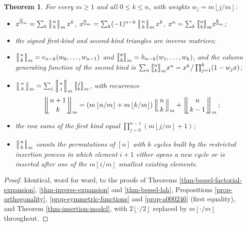 \documentclass[a4paper]{amsart}
\numberwithin{equation}{section}
\newcommand{\mStirling}[0]{\genfrac{\llbracket}{\rrbracket}{0pt}{}}
\newcommand{\mStirlingone}[2]{\left[\mkern-3.8mu\middle|\genfrac{}{}{0pt}{}{#1}{#2}\middle|\mkern-3.8mu\right]}
\newcommand{\mLah}[2]{\left\lfloor\mkern-5.5mu\left\lfloor\genfrac{}{}{0pt}{}{#1}{#2}\right\rfloor\mkern-5.5mu\right\rfloor}
\newcommand{\uuline}[1]{\underline{\underline{#1}}}
\newcommand{\ooline}[1]{\overline{\overline{#1}}}
\newcommand{\floor}[1]{\left\lfloor #1 \right\rfloor}
\newtheorem{theorem}{Theorem}[section]
\begin{document}
\begin{theorem}\label{thm-general-duals}
For every $m \geq 1$ and all $0 \le k \le n$, with weights $w_j = m\floor{j/m}$:
\begin{itemize}
\item[(i)] $x^{\ooline{n}_m} = \sum_k \mStirlingone{n}{k}_m x^k$, \quad $x^{\uuline{n}_m} = \sum_k (-1)^{n-k}\mStirlingone{n}{k}_m x^k$, \quad $x^n = \sum_k \mStirling{n}{k}_m x^{\uuline{k}_m}$;
\item[(ii)] the signed first-kind and second-kind triangles are inverse matrices;
\item[(iii)] $\mStirlingone{n}{k}_m = e_{n-k}(w_0, \ldots, w_{n-1})$ and $\mStirling{n}{k}_m = h_{n-k}(w_1, \ldots, w_k)$, and the column generating function of the second kind is $\sum_n \mStirling{n}{k}_m x^n = x^k\big/\prod_{j=1}^{k}(1 - w_j x)$;
\item[(iv)] $\mLah{n}{k}_m = \sum_j \mStirlingone{n}{j}_m \mStirling{j}{k}_m$, with recurrence
\[
\mLah{n+1}{k}_m = \left(m\floor{n/m} + m\floor{k/m}\right)\mLah{n}{k}_m + \mLah{n}{k-1}_m;
\]
\item[(v)] the row sums of the first kind equal $\prod_{j=0}^{n-1}\left(m\floor{j/m} + 1\right)$;
\item[(vi)] $\mStirlingone{n}{k}_m$ counts the permutations of $[n]$ with $k$ cycles built by the restricted insertion process in which element $i+1$ either opens a new cycle or is inserted after one of the $m\floor{i/m}$ smallest existing elements.
\end{itemize}
\end{theorem}
\begin{proof}
Identical, word for word, to the proofs of Theorems \ref{thm-bessel-factorial-expansion}, \ref{thm-inverse-expansion} and \ref{thm-bessel-lah}, Propositions \ref{prop-orthogonality}, \ref{prop-symmetric-functions} and \ref{prop-a000246} (first equality), and Theorem \ref{thm-insertion-model}, with $2\floor{\cdot/2}$ replaced by $m\floor{\cdot/m}$ throughout.
\end{proof}
\end{document}
